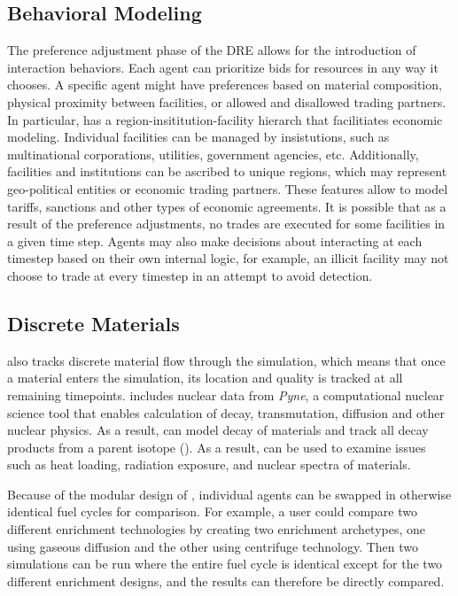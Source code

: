 \subsection{Behavioral Modeling}
The preference adjustment phase of the \gls{DRE} allows for the introduction of interaction behaviors.  Each agent can prioritize bids for resources in any way it chooses. A specific agent might have preferences based on material composition, physical proximity between facilities, or allowed and disallowed trading partners. In particular, \Cyclus has a region-insititution-facility hierarch that facilitiates economic modeling.  Individual facilities can be managed by insistutions, such as multinational corporations, utilities, government agencies, etc.  Additionally, facilities and institutions can be ascribed to unique regions, which may represent geo-political entities or economic trading partners. These features allow \Cyclus to model tariffs, sanctions and other types of economic agreements.  It is possible that as a result of the preference adjustments, no trades are executed for some facilities in a given time step.  Agents may also make decisions about interacting at each timestep based on their own internal logic, for example, an illicit facility may not choose to trade at every timestep in an attempt to avoid detection. 

\subsection{Discrete Materials}
\Cyclus also tracks discrete material flow through the simulation, which means that once a material enters the simulation, its location and quality is tracked at all remaining timepoints.  \Cyclus includes nuclear data from \emph{Pyne}, a computational nuclear science tool that enables calculation of decay, transmutation, diffusion and other nuclear physics. As a result, \Cyclus can  model decay of materials and track all decay products from a parent isotope ().  As a result, \Cyclus can be used to examine issues such as heat loading, radiation exposure, and nuclear spectra of materials.  

Because of the modular design of \Cyclus, individual agents can be swapped in otherwise identical fuel cycles for comparison. For example, a user could compare two different enrichment technologies by creating two enrichment archetypes, one using gaseous diffusion and the other using centrifuge technology. Then two simulations can be run where the entire fuel cycle is identical except for the two different enrichment designs, and the results can therefore be directly compared.

